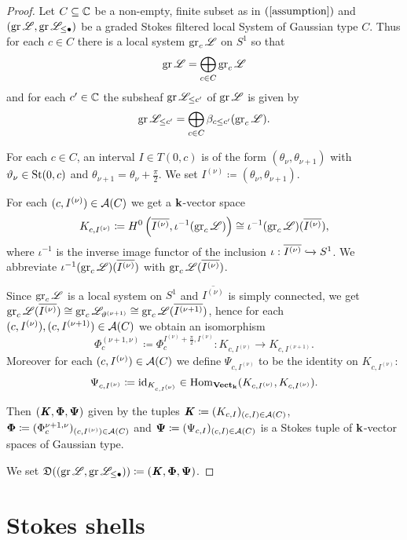 \begin{proof}
Let $C \subseteq \mathbb{C}$ be a non-empty, finite subset as in $(\ref{assumption})$ and $(\operatorname{gr}\mathscr{L}, \operatorname{gr}\mathscr{L}_{\leq \bullet})$ be a graded Stokes filtered local System of Gaussian type $C$. Thus for each $c \in C$ there is a local system $\operatorname{gr}_c\mathscr{L}$ on $S^1$ so that
\[
\operatorname{gr}\mathscr{L} = \bigoplus_{c \in C} \operatorname{gr}_c\mathscr{L}
\]
and for each $c' \in \mathbb{C}$ the subsheaf $\operatorname{gr}\mathscr{L}_{\leq c'}$ of $\operatorname{gr}\mathscr{L}$ is given by
\[\operatorname{gr}\mathscr{L}_{\leq c'} = \bigoplus_{c \in C} \beta_{c\leq c'}(\operatorname{gr}_c \mathscr{L}).\]

For each $c \in C$, an interval $I \in T(0,c)$ is of the form $(\theta_{\nu}, \theta_{\nu+1})$ with $\vartheta_{\nu} \in \operatorname{St}(0,c)$ and $\theta_{\nu+1} = \theta_\nu +\frac{\pi}{2}$. We set $I^{(\nu)} \coloneqq (\theta_{\nu}, \theta_{\nu+1})$.

For each $(c,I^{(\nu)}) \in \mathcal{A}(C)$ we get a $\mathbf{k}$-vector space \[K_{c,I^{(\nu)}} \coloneqq H^0\left(\overline{I^{(\nu)}},\iota^{-1}(\operatorname{gr}_c\mathscr{L})\right)\cong \iota^{-1}(\operatorname{gr}_c\mathscr{L})(\overline{I^{(\nu)}}),\] where $\iota^{-1}$ is the inverse image functor of the inclusion $\iota: \overline{I^{(\nu)}} \xhookrightarrow{} S^1$. We abbreviate $\iota^{-1}(\operatorname{gr}_c\mathscr{L})(\overline{I^{(\nu)}})$ with $\operatorname{gr}_c\mathscr{L}(\overline{I^{(\nu)}})$.

Since $\operatorname{gr}_c\mathscr{L}$ is a local system on $S^1$ and $\overline{I^{(\nu)}}$ is simply connected, we get $\operatorname{gr}_c\mathscr{L}(\overline{I^{(\nu)}}) \cong \operatorname{gr}_c\mathscr{L}_{\vartheta^{(\nu +1)}} \cong \operatorname{gr}_c\mathscr{L}(\overline{I^{(\nu+1)}})$, hence for each $(c, I^{(\nu)}), (c,I^{(\nu+1)}) \in \mathcal{A}(C)$ we obtain an isomorphism 
\[
    \Phi_c^{(\nu+1,\nu)}\coloneqq \Phi_c^{I^{(\nu)}+\frac{\pi}{2},I^{(\nu)}}:K_{c, I^{(\nu)}} \to K_{c,I^{(\nu+1)}}.
\] 
Moreover for each $(c, I^{(\nu)}) \in \mathcal{A}(C)$ we define $\Psi_{c,I^{(\nu)}}$ to be the identity on $K_{c,I^{(\nu)}}$:
\[
\Psi_{c,I^{(\nu)}}\coloneqq \operatorname{id}_{K_{c,I^{(\nu)}}} \in \operatorname{Hom}_{\mathbf{Vect}_{\mathbf{k}}}(K_{c,I^{(\nu)}},K_{c,I^{(\nu)}}).
\]


Then $(\bm{\mathit{K}},\bm\Phi,\bm\Psi)$ given by the tuples $\bm{\mathit{K}} \coloneqq (K_{c,I})_{(c,I) \in \mathcal{A}(C)}$, $\bm\Phi \coloneqq (\Phi_c^{\nu+1,\nu})_{(c,I^{(\nu)}) \in \mathcal{A}(C)}$ and $\bm\Psi \coloneqq (\Psi_{c,I})_{(c,I) \in \mathcal{A}(C)}$ is a Stokes tuple of $\mathbf{k}$-vector spaces of Gaussian type. 

We set $\mathfrak{D}((\operatorname{gr}\mathscr{L}, \operatorname{gr}\mathscr{L}_{\leq \bullet})) \coloneqq (\bm{\mathit{K}}, \bm{\Phi},\bm{\Psi})$.
\end{proof}


\section{Stokes shells}

